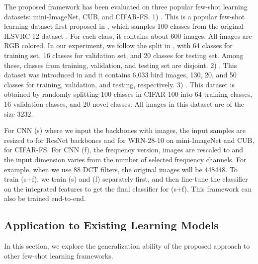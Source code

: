 \documentclass[10pt, conference, compsocconf]{IEEEtran}
\begin{document}
  The proposed framework has been evaluated on three popular few-shot learning datasets: mini-ImageNet, CUB, and CIFAR-FS.  1) . This is a popular few-shot learning dataset first proposed in  \cite{vinyals2016matching}, which samples 100 classes from the original ILSVRC-12 dataset \cite{russakovsky2015imagenet}.  For each class, it contains about 600 images. All images are  RGB colored. In our experiment, we follow the split in  \cite{ravi2016optimization}, with 64 classes for training set, 16 classes for validation set, and 20 classes for testing set. Among these, classes from training, validation, and testing set are disjoint.  2) \noindent . This dataset was introduced in  \cite{welinder2010caltech} and it contains 6,033 bird images, 130, 20, and 50 classes for training, validation, and testing, respectively. 3) \noindent . This dataset \cite{bertinetto2018meta} is obtained by randomly splitting 100 classes in CIFAR-100 \cite{krizhevsky2009learning} into 64 training classes, 16 validation classes, and 20 novel classes. All images in this dataset are of the size 3232.

  For CNN (s) where we input the backbones with images, the input samples are resized to  for ResNet \cite{he2016deep} backbones and  for WRN-28-10 \cite{zagoruyko2016wide} on mini-ImageNet and CUB,  for CIFAR-FS.  For CNN (f), the frequency version, images are rescaled to  and the input dimension varies from the number of selected frequency channels. For example, when we use 88 DCT filters, the original images will be 448448. {}{To train (s+f), we train (s) and (f) separately first, and then fine-tune the classifier on the integrated features to get the final classifier for (s+f). This framework can also be trained end-to-end.}

\subsection{Application to Existing Learning Models}
In this section, we explore the generalization ability of the proposed approach to other few-shot learning frameworks.
\end{document}
